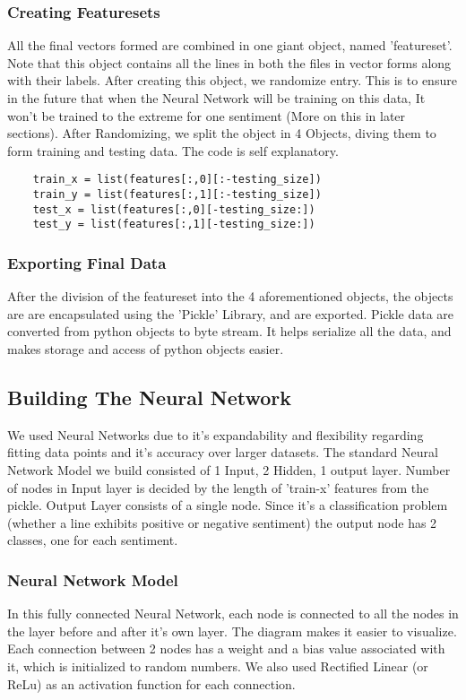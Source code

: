 \subsubsection{Creating Featuresets}
All the final vectors formed are combined in one giant object, named 'featureset'. Note that this object contains all the lines in both the files in vector forms along with their labels.
After creating this object, we randomize entry. This is to ensure in the future that when the Neural Network will be training on this data, It won't be trained to the extreme for one sentiment (More on this in later sections).
After Randomizing, we split the object in 4 Objects, diving them to form training and testing data. The code is self explanatory.

\begin{verbatim}
    train_x = list(features[:,0][:-testing_size])
    train_y = list(features[:,1][:-testing_size])
    test_x = list(features[:,0][-testing_size:])
    test_y = list(features[:,1][-testing_size:])
\end{verbatim}

\subsubsection{Exporting Final Data}
After the division of the featureset into the 4 aforementioned objects, the objects are are encapsulated using the 'Pickle' Library, and are exported. Pickle data are converted from python objects to byte stream. It helps serialize all the data, and makes storage and access of python objects easier.

\subsection{Building The Neural Network}
We used Neural Networks due to it's expandability and flexibility regarding fitting data points and it's accuracy over larger datasets. The standard Neural Network Model we build consisted of 1 Input, 2 Hidden, 1 output layer. Number of nodes in Input layer is decided by the length of 'train-x' features from the pickle. Output Layer consists of a single node. Since it's a classification problem (whether a line exhibits positive or negative sentiment) the output node has 2 classes, one for each sentiment.

\subsubsection{Neural Network Model}
In this fully connected Neural Network, each node is connected to all the nodes in the layer before and after it's own layer. The diagram makes it easier to visualize. Each connection between 2 nodes has a weight and a bias value associated with it, which is initialized to random numbers. We also used Rectified Linear (or ReLu) as an activation function for each connection. 

